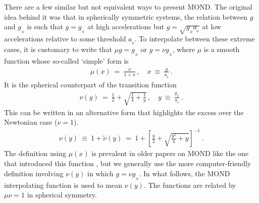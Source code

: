 \documentclass[fleqn,usenatbib,useAMS]{mnras} %
\begin{document}
There are a few similar but not equivalent ways to present MOND. The original idea behind it was that in spherically symmetric systems, the relation between $g$ and $g_{_N}$ is such that $g = g_{_N}$ at high accelerations but $g = \sqrt{g_{_N} a_{_0}}$ at low accelerations relative to some threshold $a_{_0}$. To interpolate between these extreme cases, it is customary to write that $\mu g = g_{_N}$ or $g = \nu g_{_N}$, where $\mu$ is a smooth function whose so-called `simple' form is
\begin{eqnarray}
	\mu \left( x \right) ~=~ \frac{x}{1 + x} \, , \quad x ~\equiv~ \frac{g}{a_{_0}} \, .
	\label{Simple_mu_function}
\end{eqnarray}
It is the spherical counterpart of the transition function
\begin{eqnarray}
	\nu \left( y \right) ~=~ \frac{1}{2} + \sqrt{\frac{1}{4} + \frac{1}{y}} \, , \quad y ~\equiv~ \frac{g_{_N}}{a_{_0}} \, .
	\label{g_gN_simple}
\end{eqnarray}
This can be written in an alternative form that highlights the excess over the Newtonian case ($\nu = 1$).
\begin{eqnarray}
	\nu \left( y \right) ~\equiv~ 1 + \widetilde{\nu} \left( y \right) ~=~ 1 + \left[\frac{y}{2}+\sqrt{\frac{y^2}{4} + y} \right]^{-1} \, .
\end{eqnarray}
The definition using $\mu \left( x \right)$ is prevalent in older papers on MOND like the one that introduced this function \citep{Famaey_Binney_2005}, but we generally use the more computer-friendly definition involving $\nu \left( y \right)$ in which $g = \nu g_{_N}$. In what follows, the MOND interpolating function is used to mean $\nu \left( y \right)$. The functions are related by $\mu \nu = 1$ in spherical symmetry.
\end{document}
